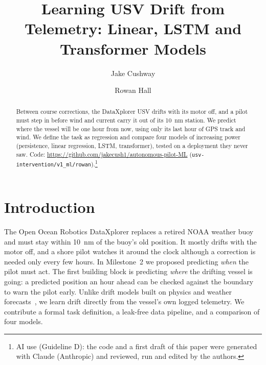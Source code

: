 \documentclass[sigconf]{acmart}
\begin{document}
\title{Learning USV Drift from Telemetry: Linear, LSTM and Transformer Models}
\author{Jake Cushway}

\author{Rowan Hall}

\begin{abstract}
Between course corrections, the DataXplorer\texttrademark{} USV drifts with its motor off, and a pilot must step in before wind and current carry it out of its 10~nm station. We predict where the vessel will be one hour from now, using only its last hour of GPS track and wind. We define the task as regression and compare four models of increasing power (persistence, linear regression, LSTM, transformer), tested on a deployment they never saw. Code: \url{https://github.com/jakecush1/autonomous-pilot-ML} (\texttt{usv-intervention/v1\_ml/rowan}).\footnote{AI use (Guideline D): the code and a first draft of this paper were generated with Claude (Anthropic) and reviewed, run and edited by the authors.}
\end{abstract}

\maketitle
\pagestyle{empty}

\section{Introduction}\label{sec:intro}
The Open Ocean Robotics DataXplorer replaces a retired NOAA weather buoy and must stay within 10~nm of the buoy's old position. It mostly drifts with the motor off, and a shore pilot watches it around the clock although a correction is needed only every few hours. In Milestone~2 we proposed predicting \emph{when} the pilot must act. The first building block is predicting \emph{where} the drifting vessel is going: a predicted position an hour ahead can be checked against the boundary to warn the pilot early. Unlike drift models built on physics and weather forecasts~\cite{dugan2024drifting,song2024drift}, we learn drift directly from the vessel's own logged telemetry. We contribute a formal task definition, a leak-free data pipeline, and a comparison of four models.
\end{document}
